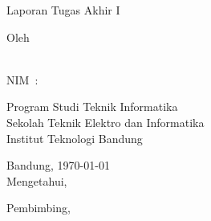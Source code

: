 
\begin{center}
  \smallskip
  \thispagestyle{empty}
  \Large \bfseries \MakeUppercase{\thetitle}
  \vfill

  \normalsize Laporan Tugas Akhir I
  \vfill

  \large Oleh
  
  \large \uppercase{\theauthor} \\
  \large NIM~:~\uppercase{\nim}

  \vfill

  \normalfont{}
  \normalsize Program Studi Teknik Informatika \\
  \normalsize Sekolah Teknik Elektro dan Informatika \\
  \normalsize Institut Teknologi Bandung \\
  \vfill

  \normalsize Bandung, \today \\
  \normalsize Mengetahui, \\
  \vfill

  Pembimbing,
  \vfill

  \uppercase{\supervisor{}} \\
  
\end{center}